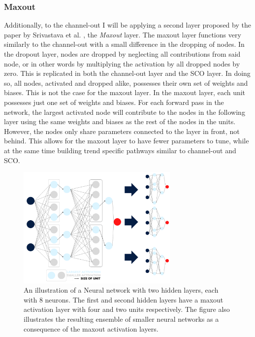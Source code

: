 \subsubsection*{Maxout}\label{subsubsec:maxout} 
Additionally, to the channel-out I will be applying a second layer proposed by the paper by Srivastava et al. \cite{wang_maxout_2013}, 
the \emph{Maxout} layer. The maxout layer functions very similarly to the channel-out with a small difference in the dropping of nodes. 
In the dropout layer, nodes are dropped by neglecting all contributions from said node, or in other words by multiplying the activation 
by all dropped nodes by zero. This is replicated in both the channel-out layer and the \ac{SCO} layer. In doing so, all nodes, activated 
and dropped alike, possesses their own set of weights and biases. This is not the case for the maxout layer.
In the maxout layer, each unit possesses just one set of weights and biases. For each forward pass in the network, the largest activated 
node will contribute to the nodes in the following layer using the same weights and biases as the rest of the nodes in the units. However, 
the nodes only share parameters connected to the layer in front, not behind. This allows for the maxout layer to have fewer parameters to 
tune, while at the same time building trend specific pathways similar to channel-out and \ac{SCO}. \\
\begin{figure}
    \centering
    \includegraphics[width=0.7\textwidth]{Figures/Illustrations/Max_out.png}
    \caption[An illustration of a Neural network with two hidden layers using the maxout layer.]{An illustration of a Neural network with two hidden layers, each with 8 neurons.
    The first and second hidden layers have a maxout activation layer with four and two units respectively.
    The figure also illustrates the resulting ensemble of smaller neural networks as a consequence
    of the maxout activation layers. }
    \label{fig:Max_out}
\end{figure}
